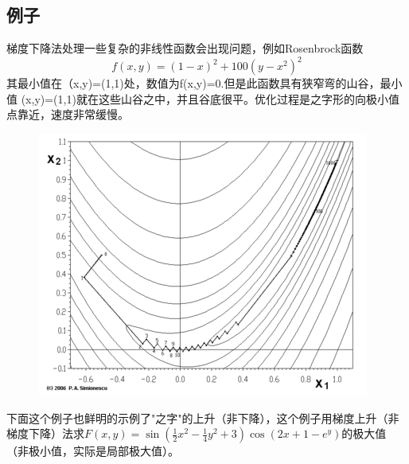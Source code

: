 \documentclass[12pt,a4paper]{article}
\begin{document}
\subsection{例子}
梯度下降法处理一些复杂的非线性函数会出现问题，例如Rosenbrock函数
\begin{equation}
	f(x,y)=(1-x)^2+100(y-x^2)^2
\end{equation}
其最小值在（x,y)=(1,1)处，数值为f(x,y)=0.但是此函数具有狭窄弯的山谷，最小值 (x,y)=(1,1)就在这些山谷之中，并且谷底很平。优化过程是之字形的向极小值点靠近，速度非常缓慢。

\begin{figure}[H]
\centering
\includegraphics[scale=0.4]{./figures/Figure_3.png}
\end{figure}
下面这个例子也鲜明的示例了"之字"的上升（非下降），这个例子用梯度上升（非梯度下降）法求$ F(x,y)=\sin \left({\frac  {1}{2}}x^{2}-{\frac  {1}{4}}y^{2}+3\right)\cos(2x+1-e^{y})$的极大值（非极小值，实际是局部极大值）。
\end{document}
